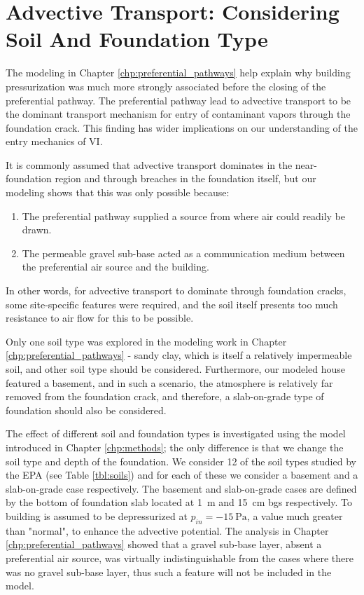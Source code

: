 \section{Advective Transport: Considering Soil And Foundation Type}

The modeling in Chapter \ref{chp:preferential_pathways} help explain why building pressurization was much more strongly associated before the closing of the preferential pathway.
The preferential pathway lead to advective transport to be the dominant transport mechanism for entry of contaminant vapors through the foundation crack.
This finding has wider implications on our understanding of the entry mechanics of VI.\par

It is commonly assumed that advective transport dominates in the near-foundation region and through breaches in the foundation itself, but our modeling shows that this was only possible because:
\begin{enumerate}
  \item The preferential pathway supplied a source from where air could readily be drawn.
  \item The permeable gravel sub-base acted as a communication medium between the preferential air source and the building.
\end{enumerate}
In other words, for advective transport to dominate through foundation cracks, some site-specific features were required, and the soil itself presents too much resistance to air flow for this to be possible.\par

Only one soil type was explored in the modeling work in Chapter \ref{chp:preferential_pathways} - sandy clay, which is itself a relatively impermeable soil, and other soil type should be considered.
Furthermore, our modeled house featured a basement, and in such a scenario, the atmosphere is relatively far removed from the foundation crack, and therefore, a slab-on-grade type of foundation should also be considered.\par

The effect of different soil and foundation types is investigated using the model introduced in Chapter \ref{chp:methods}; the only difference is that we change the soil type and depth of the foundation.
We consider 12 of the soil types studied by the EPA (see Table \ref{tbl:soils}) and for each of these we consider a basement and a slab-on-grade case respectively.
The basement and slab-on-grade cases are defined by the bottom of foundation slab located at \SI{1}{\metre} and \SI{15}{\centi\metre} bgs respectively.
To building is assumed to be depressurized at $p_{in} = \SI{-15}{\pascal}$, a value much greater than "normal", to enhance the advective potential.
The analysis in Chapter \ref{chp:preferential_pathways} showed that a gravel sub-base layer, absent a preferential air source, was virtually indistinguishable from the cases where there was no gravel sub-base layer, thus such a feature will not be included in the model.\par

